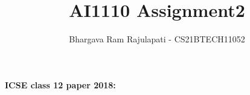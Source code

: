 \documentclass[journal,12pt,twocolumn]{IEEEtran}
\DeclareMathOperator*{\Res}{Res}
\begin{document}
	
	\newcommand{\BEQA}{\begin{eqnarray}}
		\newcommand{\EEQA}{\end{eqnarray}}
	\newcommand{\define}{\stackrel{\triangle}{=}}
	
	\raggedbottom
	\setlength{\parindent}{0pt}
	\providecommand{\mbf}{\mathbf}
	\providecommand{\pr}[1]{\ensuremath{\Pr\left(#1\right)}}
	\providecommand{\qfunc}[1]{\ensuremath{Q\left(#1\right)}}
	\providecommand{\sbrak}[1]{\ensuremath{{}\left[#1\right]}}
	\providecommand{\lsbrak}[1]{\ensuremath{{}\left[#1\right.}}
	\providecommand{\rsbrak}[1]{\ensuremath{{}\left.#1\right]}}
	\providecommand{\brak}[1]{\ensuremath{\left(#1\right)}}
	\providecommand{\lbrak}[1]{\ensuremath{\left(#1\right.}}
	\providecommand{\rbrak}[1]{\ensuremath{\left.#1\right)}}
	\providecommand{\cbrak}[1]{\ensuremath{\left\{#1\right\}}}
	\providecommand{\lcbrak}[1]{\ensuremath{\left\{#1\right.}}
	\providecommand{\rcbrak}[1]{\ensuremath{\left.#1\right\}}}
	\theoremstyle{remark}
	\newtheorem{rem}{Remark}
	\newcommand{\sgn}{\mathop{\mathrm{sgn}}}
	\providecommand{\abs}[1]{$\left\vert#1\right\vert$}
	\providecommand{\res}[1]{\Res\displaylimits_{#1}} 
	\providecommand{\norm}[1]{$\left\lVert#1\right\rVert$}
	\providecommand{\mtx}[1]{\mathbf{#1}}
	\providecommand{\mean}[1]{E$\left[ #1 \right]$}
	\providecommand{\fourier}{\overset{\mathcal{F}}{ \rightleftharpoons}}
	\providecommand{\system}{\overset{\mathcal{H}}{ \longleftrightarrow}}
	\newcommand{\solution}{\noindent \textbf{Solution: }}
	\newcommand{\cosec}{\,\text{cosec}\,}
	\providecommand{\dec}[2]{\ensuremath{\overset{#1}{\underset{#2}{\gtrless}}}}
	\newcommand{\myvec}[1]{\ensuremath{\begin{pmatrix}#1\end{pmatrix}}}
	\newcommand{\mydet}[1]{\ensuremath{\begin{vmatrix}#1\end{vmatrix}}}
	\makeatletter
	\makeatother
	\let\StandardTheFigure\thefigure
	\let\vec\mathbf
	\vspace{3cm}
    \title{AI1110 Assignment2}
    \author{Bhargava Ram Rajulapati - CS21BTECH11052}
    \maketitle
	\newpage
	\bigskip
	\renewcommand{\thefigure}{\theenumi}
	\renewcommand{\thetable}{\theenumi}
 \textbf{ICSE class 12 paper 2018:}
\end{document}
